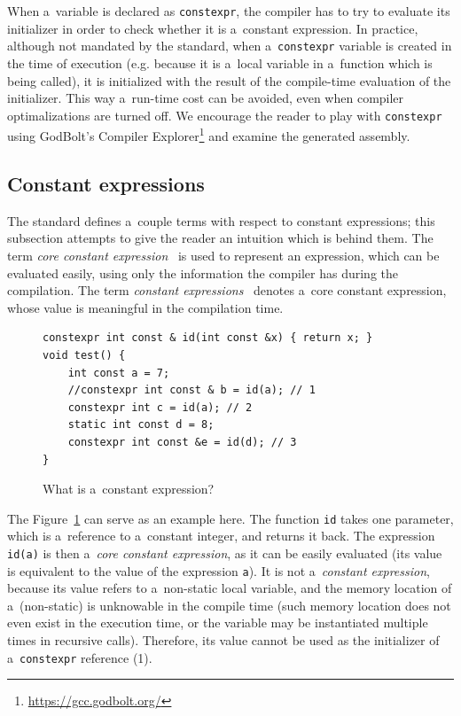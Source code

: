 \documentclass[nolot,nolof,nocover,printed]{fithesis3}
\newcommand{\stdN}[2]{\cite[#2]{#1}\xspace}
\begin{document}
When a~variable is declared as \lstinline|constexpr|, the compiler has to try to evaluate its initializer in order to check whether it is a~constant expression. In practice, although not mandated by the standard, when a~\lstinline|constexpr| variable is created in the time of execution (e.g. because it is a~local variable in a~function which is being called), it is initialized with the result of the compile-time evaluation of the initializer. This way a~run-time cost can be avoided, even when compiler optimalizations are turned off. We encourage the reader to play with \lstinline|constexpr| using GodBolt's Compiler Explorer\footnote{\url{https://gcc.godbolt.org/}} and examine the generated assembly.




\subsection{Constant expressions}

The standard defines a~couple terms with respect to constant expressions; this subsection attempts to give the reader an intuition which is behind them. The term \textit{core constant expression}~\stdN{n4296}{\S 5.20.2} is used to represent an expression, which can be evaluated easily, using only the information the compiler has during the compilation. The term \textit{constant expressions}~\stdN{n4296}{\S 5.20/5} denotes a~core constant expression, whose value is meaningful in the compilation time.

\begin{figure}
\begin{lstlisting}
constexpr int const & id(int const &x) { return x; }
void test() {
	int const a = 7;
	//constexpr int const & b = id(a); // 1
	constexpr int c = id(a); // 2
	static int const d = 8;
	constexpr int const &e = id(d); // 3
}
\end{lstlisting}
\caption{What is a~constant expression?}
\label{fig:constexprIntuition}
\end{figure}

The Figure~\ref{fig:constexprIntuition} can serve as an example here. The function \lstinline|id| takes one parameter, which is a~reference to a~constant integer, and returns it back. The expression \lstinline|id(a)| is then a~\textit{core constant expression}, as it can be easily evaluated (its value is equivalent to the value of the expression \lstinline|a|). It is not a~\textit{constant expression}, because its value refers to a~non-static local variable, and the memory location of a~(non-static) is unknowable in the compile time (such memory location does not even exist in the execution time, or the variable may be instantiated multiple times in recursive calls). Therefore, its value cannot be used as the initializer of a~\lstinline|constexpr| reference (1).
\end{document}
